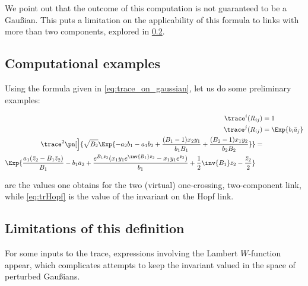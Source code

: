 We point out that the outcome of this computation is not guaranteed to be a
Gaußian. This puts a limitation on the applicability of this formula to links
with more than two components, explored in \cref{sec:limitations}.

\subsection{Computational examples}

Using the formula given in \cref{eq:trace_on_gaussian}, let us do some
preliminary examples:

\begin{align}
        \trace^i(R_{ij}) &= 1\label{eq:trR}\\
        \trace^j(R_{ij}) &= \Exp{b_i\ba_j}\label{eq:trR2}\\
        \begin{split}\label{eq:trHopf}
                \trace^2\pn[\Big]{\sqrt{B_2}\Exp{
                                -a_2 b_1-a_1 b_2 +
                                \frac{(B_1-1) x_2 y_1}{b_1 B_1}+
                        \frac{(B_2-1) x_1 y_2}{b_2 B_2}}
                } &= \\
                \Exp{
                        \frac{a_1 (\bz_2-B_1 \bz_2)}{B_1}-b_1 \ba_2+
                        \frac{e^{B_1 \bz_2}
                        (x_1 y_1 e^{\inv{B_1} \bz_2}-x_1 y_1 e^{\bz_2})}{b_1}+
                        \frac{1}{2} \inv{B_1} \bz_2-\frac{\bz_2}{2}
                }&%
        \end{split}
\end{align}

 are the values one obtains for the two (virtual)
one-crossing, two-component link, while \cref{eq:trHopf} is the value of the
invariant on the Hopf link.

\subsection{Limitations of this definition}\label{sec:limitations}
For some inputs to the trace, expressions involving the Lambert $W$-function
appear, which complicates attempts to keep the invariant valued in the space of
perturbed Gaußians.


